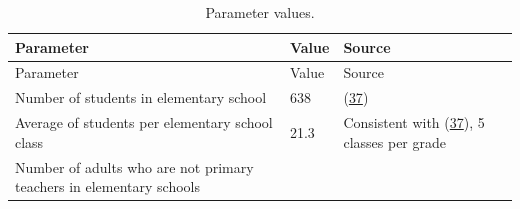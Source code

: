 \documentclass[
]{article}
\begin{document}
\clearpage

\begin{longtable}[]{@{}lll@{}}
\caption{Parameter values. \label{tab:tbl1}}\tabularnewline
\toprule
\begin{minipage}[b]{0.28\columnwidth}\raggedright
Parameter\strut
\end{minipage} & \begin{minipage}[b]{0.09\columnwidth}\raggedright
Value\strut
\end{minipage} & \begin{minipage}[b]{0.54\columnwidth}\raggedright
Source\strut
\end{minipage}\tabularnewline
\midrule
\endfirsthead
\toprule
\begin{minipage}[b]{0.28\columnwidth}\raggedright
Parameter\strut
\end{minipage} & \begin{minipage}[b]{0.09\columnwidth}\raggedright
Value\strut
\end{minipage} & \begin{minipage}[b]{0.54\columnwidth}\raggedright
Source\strut
\end{minipage}\tabularnewline
\midrule
\endhead
\begin{minipage}[t]{0.28\columnwidth}\raggedright
Number of students in elementary school\strut
\end{minipage} & \begin{minipage}[t]{0.09\columnwidth}\raggedright
638\strut
\end{minipage} & \begin{minipage}[t]{0.54\columnwidth}\raggedright
(\protect\hyperlink{ref-noauthor_digest_nodate}{37})\strut
\end{minipage}\tabularnewline
\begin{minipage}[t]{0.28\columnwidth}\raggedright
Average of students per elementary school class\strut
\end{minipage} & \begin{minipage}[t]{0.09\columnwidth}\raggedright
21.3\strut
\end{minipage} & \begin{minipage}[t]{0.54\columnwidth}\raggedright
Consistent with (\protect\hyperlink{ref-noauthor_digest_nodate}{37}), 5
classes per grade\strut
\end{minipage}\tabularnewline
\begin{minipage}[t]{0.28\columnwidth}\raggedright
Number of adults who are not primary teachers in elementary
schools\strut
\end{minipage} & \begin{minipage}[t]{0.09\columnwidth}\raggedright

\end{minipage}
\end{longtable}
\end{document}
